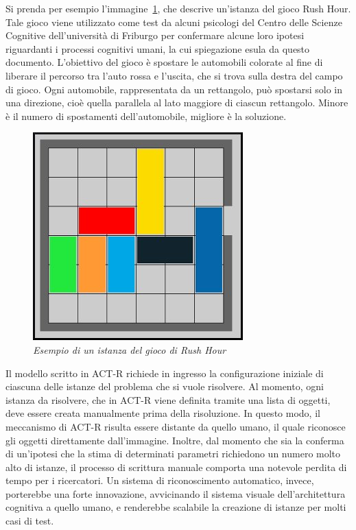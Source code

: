 		Si prenda per esempio l'immagine~\ref{fig:RushHourHumanIta}, che descrive un'istanza del gioco Rush Hour.
		Tale gioco viene utilizzato come test da alcuni psicologi del Centro delle Scienze Cognitive dell'università di Friburgo per confermare alcune loro ipotesi riguardanti i processi cognitivi umani, la cui spiegazione esula da questo documento.
		L'obiettivo del gioco è spostare le automobili colorate al fine di liberare il percorso tra l'auto rossa e l'uscita, che si trova sulla destra del campo di gioco.
		Ogni automobile, rappresentata da un rettangolo, può spostarsi solo in una direzione, cioè quella parallela al lato maggiore di ciascun rettangolo.
		Minore è il numero di spostamenti dell'automobile, migliore è la soluzione. 	

		\begin{figure}[!h]
		  \begin{center} 
			 \includegraphics[scale=0.6]{images/ch_03/originale.jpg}	
		  \end{center} 
		  \caption{\textit{Esempio di un istanza del gioco di Rush Hour}}
		  \label{fig:RushHourHumanIta}	
	  	\end{figure}

		Il modello scritto in \mbox{ACT-R} richiede in ingresso la configurazione iniziale di ciascuna delle istanze del problema che si vuole risolvere.
		Al momento, ogni istanza da risolvere, che in \mbox{ACT-R} viene definita tramite una lista di oggetti, deve essere creata manualmente prima della risoluzione. 
		In questo modo, il meccanismo di \mbox{ACT-R} risulta essere distante da quello umano, il quale riconosce gli oggetti direttamente dall'immagine. 
		Inoltre, dal momento che sia la conferma di un'ipotesi che la stima di determinati parametri richiedono un numero molto alto di istanze, il processo di scrittura manuale comporta una notevole perdita di tempo per i ricercatori.
		Un sistema di riconoscimento automatico, invece, porterebbe una forte innovazione, avvicinando il sistema visuale dell'architettura cognitiva a quello umano, e renderebbe scalabile la creazione di istanze per molti casi di test.
		
